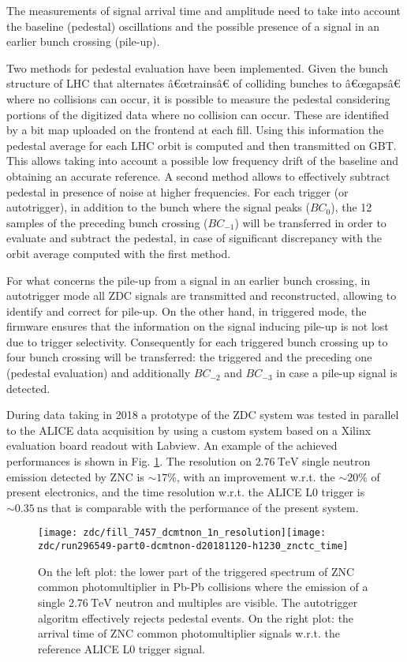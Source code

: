 The measurements of signal arrival time and amplitude need to take into account the baseline (pedestal) oscillations and the possible presence of a signal in an earlier bunch crossing (pile-up).

Two methods for pedestal evaluation have been implemented. Given the bunch structure of LHC that alternates â€œtrainsâ€ of colliding bunches to â€œgapsâ€ where no collisions can occur, it is possible to measure the pedestal considering portions of the digitized data where no collision can occur. These are identified by a bit map uploaded on the frontend at each fill. Using this information the pedestal average for each LHC orbit is computed and then transmitted on GBT. This allows taking into account a possible low frequency drift of the baseline and obtaining an accurate reference. A second method allows to effectively subtract pedestal in presence of noise at higher frequencies. For each trigger (or autotrigger), in addition to the bunch where the signal peaks ($BC_0$), the 12 samples of the preceding bunch crossing ($BC_{-1}$) will be transferred in order to evaluate and subtract the pedestal, in case of significant discrepancy with the orbit average computed with the first method.

For what concerns the pile-up from a signal in an earlier bunch crossing, in autotrigger mode all ZDC signals are transmitted and reconstructed, allowing to identify and correct for pile-up. On the other hand, in triggered mode, the firmware ensures that the information on the signal inducing pile-up is not lost due to trigger selectivity. Consequently for each triggered bunch crossing up to four bunch crossing will be transferred: the triggered and the preceding one (pedestal evaluation) and additionally $BC_{-2}$ and $BC_{-3}$ in case a pile-up signal is detected.

During \PbPb data taking in 2018 a prototype of the ZDC system was tested in parallel to the ALICE data acquisition by using a custom system based on a Xilinx evaluation board readout with Labview. An example of the achieved performances is shown in Fig. \ref{fig:zdc-signals}. The resolution on $\SI{2.76}{\tera\electronvolt}$ single neutron emission detected by ZNC is $\sim17\%$, with an improvement w.r.t. the $\sim20\%$ of present electronics, and the time resolution w.r.t. the ALICE L0 trigger is $\sim\SI{0.35}{\nano\second}$ that is comparable with the performance of the present system.

\begin{figure}
    \texttt{[image: zdc/fill\_7457\_dcmtnon\_1n\_resolution]}\texttt{[image: zdc/run296549-part0-dcmtnon-d20181120-h1230\_znctc\_time]}

    \caption{\label{fig:zdc-signals}On the left plot: the lower part of the triggered spectrum of ZNC common photomultiplier in Pb-Pb collisions where the emission of a single $\SI{2.76}{\tera\electronvolt}$ neutron  and multiples are visible. The autotrigger algoritm effectively rejects pedestal events. On the right plot: the arrival time of ZNC common photomultiplier
    signals w.r.t. the reference ALICE L0 trigger signal.}
\end{figure}
